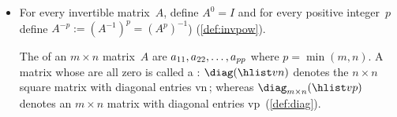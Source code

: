 \begin{itemize}
\itemme If \(A\) is an {invertible} matrix, then its  is unique, and denoted by~\(A^{-1}\) (\cref{thm:uninv}).

\itemhi For every \(2\times2\) matrix \(A=\begin{bmat} a&b\\c&d \end{bmat}\), the matrix~\(A\) is {invertible} if and only if the  \(ad-bc\neq0\) (\cref{thm:2x2det}), in which case
\begin{equation*}
A^{-1}=\frac1{ad-bc}\begin{bmatrix} d&-b\\-c&a \end{bmatrix}.
\end{equation*}

\itemme If a matrix~\(A\) is {invertible}, then  \(A\xv=\bv\) has the {unique solution} \(\xv=A^{-1}\bv\) for every~\(\bv\) (\cref{thm:invuniqsol}).

\itemme For all invertible matrices,~\(A\) and~\(B\), the inverse has the properties (\cref{thm:invprop}):
\begin{itemize}
\item  matrix \(A^{-1}\) is invertible and \((A^{-1})^{-1}=A\)\,;
\item if scalar \(c\neq0\)\,, then matrix~\(cA\) is invertible and \((cA)^{-1}=\frac1cA^{-1}\);
\item matrix \(AB\) is invertible and \((AB)^{-1}=B^{-1}A^{-1}\) (remember the reversed order);
\item matrix \(\tr A\) is invertible and \((\tr A)^{-1}=\tr{(A^{-1})}\);
\item matrices \(A^p\) are invertible for all \(p=1,2,3,\ldots\) and \((A^p)^{-1}=(A^{-1})^p\).
\end{itemize}

\item For every {invertible} matrix~\(A\), define \(A^0=I\) and for every positive integer~\(p\) define \(A^{-p}:=(A^{-1})^p=(A^p)^{-1}\)) (\cref{def:invpow}).

\itemhi The  of an \(m\times n\) matrix~\(A\) are  \(\sloppy a_{11}, a_{22}, \ldots, a_{pp}\) where \(p=\min(m,n)\).
A matrix whose  are all zero is called a : \(\diag(\hlist vn)\) denotes the \(n\times n\) square matrix with diagonal entries \hlist vn\,; whereas \(\diag_{m\times n}(\hlist vp)\) denotes an \(m\times n\) matrix with diagonal entries \hlist vp\ (\cref{def:diag}).


\end{itemize}
